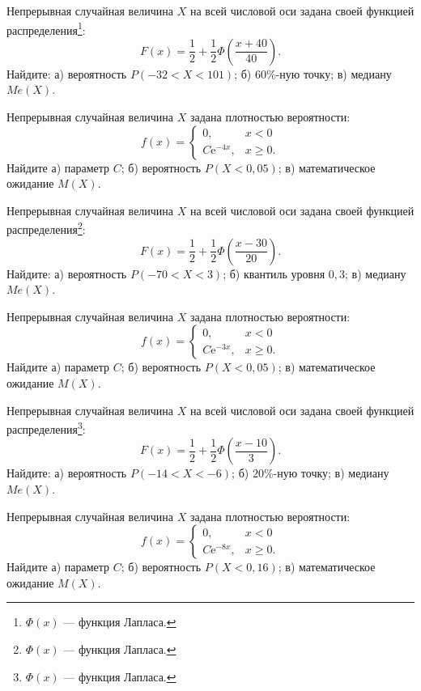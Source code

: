 \vfill

\newpage\setcounter{zad}{0}

\z Непрерывная случайная величина $X$ на всей числовой оси задана своей функцией распределения\footnote{$\Phi(x)$ --- функция Лапласа.}: $$ F(x) = \frac{1}{2} + \frac{1}{2}\Phi\left( \frac{x + 40}{40} \right). $$ Найдите: а) вероятность $P(-32 < X < 101)$; б) $60\%$-ную точку; в) медиану $Me(X)$.


\vfill

\z Непрерывная случайная величина $X$ задана плотностью вероятности: $$ f(x) = \begin{cases}0, & x < 0 \\ C\mathrm{e}^{-4x}, & x \geqslant 0.\end{cases} $$ Найдите а) параметр $C$; б) вероятность $P(X < 0{,}05)$; в) математическое ожидание $M(X)$.
 

\vfill

\newpage\setcounter{zad}{0}

\z Непрерывная случайная величина $X$ на всей числовой оси задана своей функцией распределения\footnote{$\Phi(x)$ --- функция Лапласа.}: $$ F(x) = \frac{1}{2} + \frac{1}{2}\Phi\left( \frac{x - 30}{20} \right). $$ Найдите: а) вероятность $P(-70 < X < 3)$; б) квантиль уровня $0{,}3$; в) медиану $Me(X)$.


\vfill

\z Непрерывная случайная величина $X$ задана плотностью вероятности: $$ f(x) = \begin{cases}0, & x < 0 \\ C\mathrm{e}^{-3x}, & x \geqslant 0.\end{cases} $$ Найдите а) параметр $C$; б) вероятность $P(X < 0{,}05)$; в) математическое ожидание $M(X)$.
 

\vfill

\newpage\setcounter{zad}{0}

\z Непрерывная случайная величина $X$ на всей числовой оси задана своей функцией распределения\footnote{$\Phi(x)$ --- функция Лапласа.}: $$ F(x) = \frac{1}{2} + \frac{1}{2}\Phi\left( \frac{x - 10}{3} \right). $$ Найдите: а) вероятность $P(-14 < X < -6)$; б) $20\%$-ную точку; в) медиану $Me(X)$.


\vfill

\z Непрерывная случайная величина $X$ задана плотностью вероятности: $$ f(x) = \begin{cases}0, & x < 0 \\ C\mathrm{e}^{-8x}, & x \geqslant 0.\end{cases} $$ Найдите а) параметр $C$; б) вероятность $P(X < 0{,}16)$; в) математическое ожидание $M(X)$.
 


